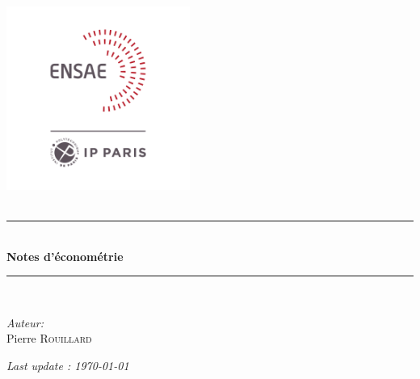 \newcommand{\HRule}{\rule{\linewidth}{0.5mm}}

\begin{titlepage}
\begin{center}

\includegraphics[width=0.45\textwidth]{Core/logo.png}~\\[1cm]


\textsc{\Large }\\[0.5cm]

\begin{center}

\HRule \\[1cm]
{\huge \bfseries{Notes d'économétrie}}\\[0.5cm]
\HRule \\[2.5cm]

\end{center}


\begin{minipage}{0.4\textwidth}
\begin{flushleft} \large
\emph{Auteur:}\\
Pierre \textsc{Rouillard}\\


\end{flushleft}
\end{minipage}
\begin{minipage}{0.4\textwidth}
\begin{flushright} \large
\end{flushright}
\end{minipage}

\vfill

{ \textit{Last update : \today}}

\end{center}
\end{titlepage}